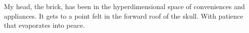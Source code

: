

My head, the brick, has been in the hyperdimensional space of
conveniences and appliances.  It gets to a point felt in the forward
roof of the skull.  With patience that evaporates into peace.

\bye
